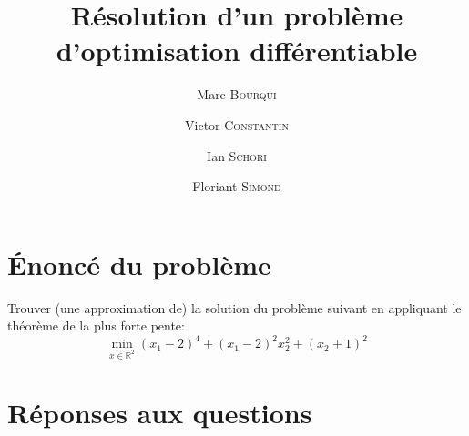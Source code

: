 \documentclass[11pt,a4paper,twoside,onecolumn,titlepage]{report}
\title{Résolution d'un problème d'optimisation différentiable}
\author{Marc \textsc{Bourqui} \and Victor \textsc{Constantin} \and Ian \textsc{Schori} \and Floriant \textsc{Simond}}
\begin{document}


\section*{Énoncé du problème}

Trouver (une approximation de) la solution du problème suivant en appliquant le théorème de la plus forte pente:
\begin{equation}
\min_{x\in\mathbb{R}^2} (x_1-2)^4 + (x_1-2)^2x_2^2 + (x_2+1)^2
\end{equation}

\section*{Réponses aux questions}
\end{document}
